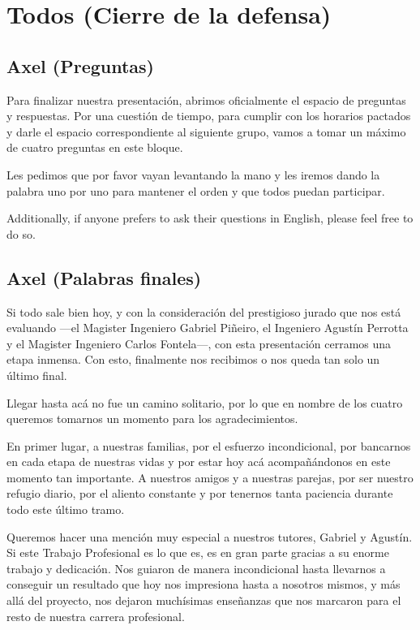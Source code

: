 \section{Todos (Cierre de la defensa)}

\subsection{Axel (Preguntas)}

Para finalizar nuestra presentación, abrimos oficialmente el espacio de preguntas y respuestas. Por una cuestión de tiempo, para cumplir con los horarios pactados y darle el espacio correspondiente al siguiente grupo, vamos a tomar un máximo de cuatro preguntas en este bloque. 

Les pedimos que por favor vayan levantando la mano y les iremos dando la palabra uno por uno para mantener el orden y que todos puedan participar.

Additionally, if anyone prefers to ask their questions in English, please feel free to do so.

\subsection{Axel (Palabras finales)}

Si todo sale bien hoy, y con la consideración del prestigioso jurado que nos está evaluando —el Magister Ingeniero Gabriel Piñeiro, el Ingeniero Agustín Perrotta y el Magister Ingeniero Carlos Fontela—, con esta presentación cerramos una etapa inmensa. Con esto, finalmente nos recibimos o nos queda tan solo un último final.

Llegar hasta acá no fue un camino solitario, por lo que en nombre de los cuatro queremos tomarnos un momento para los agradecimientos. 

En primer lugar, a nuestras familias, por el esfuerzo incondicional, por bancarnos en cada etapa de nuestras vidas y por estar hoy acá acompañándonos en este momento tan importante. A nuestros amigos y a nuestras parejas, por ser nuestro refugio diario, por el aliento constante y por tenernos tanta paciencia durante todo este último tramo.

Queremos hacer una mención muy especial a nuestros tutores, Gabriel y Agustín. Si este Trabajo Profesional es lo que es, es en gran parte gracias a su enorme trabajo y dedicación. Nos guiaron de manera incondicional hasta llevarnos a conseguir un resultado que hoy nos impresiona hasta a nosotros mismos, y más allá del proyecto, nos dejaron muchísimas enseñanzas que nos marcaron para el resto de nuestra carrera profesional.

